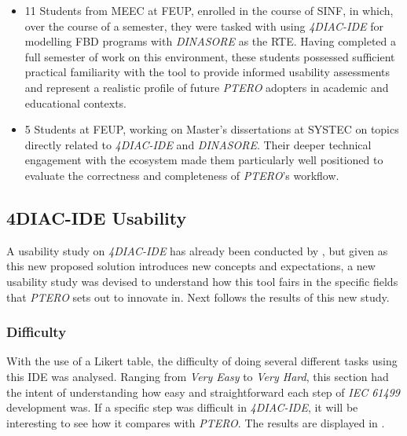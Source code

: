 \begin{itemize}
\item 11 Students from \ac{MEEC} at \ac{FEUP}, enrolled in the course of \ac{SINF}, in which, over the course of a semester, they were tasked with using \textit{4DIAC-IDE} for modelling \ac{FBD} programs with \textit{DINASORE} as the \ac{RTE}. Having completed a full semester of work on this environment, these students possessed sufficient practical familiarity with the tool to provide informed usability assessments and represent a realistic profile of future \textit{PTERO} adopters in academic and educational contexts.
\item 5 Students at \ac{FEUP}, working on Master's dissertations at \ac{SYSTEC} on topics directly related to \textit{4DIAC-IDE} and \textit{DINASORE}. Their deeper technical engagement with the ecosystem made them particularly well positioned to evaluate the correctness and completeness of \textit{PTERO}'s workflow.
\end{itemize}

\subsection{4DIAC-IDE Usability}
A usability study on \textit{4DIAC-IDE} has already been conducted by \citeauthor{weber_usability_2019} \cite{weber_usability_2019}, but given as this new proposed solution introduces new concepts and expectations, a new usability study was devised to understand how this tool fairs in the specific fields that \textit{PTERO} sets out to innovate in. Next follows the results of this new study.

\subsubsection*{Difficulty}
With the use of a Likert \cite{koo_likert-type_2025} table, the difficulty of doing several different tasks using this \ac{IDE} was analysed. Ranging from \textit{Very Easy} to \textit{Very Hard}, this section had the intent of understanding how easy and straightforward each step of \textit{IEC 61499} development was. If a specific step was difficult in \textit{4DIAC-IDE}, it will be interesting to see how it compares with \textit{PTERO}. The results are displayed in .

